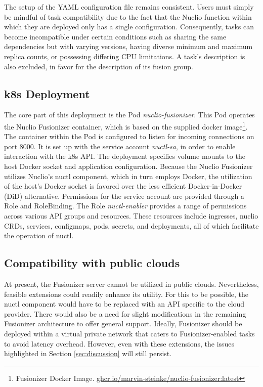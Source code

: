 The setup of the YAML configuration file remains consistent. Users must simply
be mindful of task compatibility due to the fact that the Nuclio function within
which they are deployed only has a single configuration. Consequently, tasks can
become incompatible under certain conditions such as sharing the same
dependencies but with varying versions, having diverse minimum and maximum
replica counts, or possessing differing CPU limitations. A task's description is
also excluded, in favor for the description of its fusion group.

\subsection{k8s Deployment}

The core part of this deployment is the Pod \emph{nuclio-fusionizer}. This Pod
operates the Nuclio Fusionizer container, which is based on the supplied docker
image\footnote{Fusionizer Docker Image.
\url{ghcr.io/marvin-steinke/nuclio-fusionizer:latest}}. The container within the
Pod is configured to listen for incoming connections on port 8000. It is set up
with the service account \emph{nuctl-sa}, in order to enable interaction with
the k8s API. The deployment specifies volume mounts to the host Docker socket
and application configuration. Because the Nuclio Fusionizer utilizes Nuclio's
nuctl component, which in turn employs Docker, the utilization of the host's
Docker socket is favored over the less efficient Docker-in-Docker (DiD)
alternative. Permissions for the service account are provided through a Role and
RoleBinding. The Role \emph{nuctl-enabler} provides a range of permissions
across various API groups and resources. These resources include ingresses,
nuclio CRDs, services, configmaps, pods, secrets, and deployments, all of which
facilitate the operation of nuctl.

\subsection{Compatibility with public clouds}
\label{subsec:fusionize:compatibility_with_public_clouds}


At present, the Fusionizer server cannot be utilized in public clouds.
Nevertheless, feasible extensions could readily enhance its utility. For this to
be possible, the nuctl component would have to be replaced with an API specific
to the cloud provider. There would also be a need for slight modifications in
the remaining Fusionizer architecture to offer general support. Ideally,
Fusionizer should be deployed within a virtual private network that caters to
Fusionizer-enabled tasks to avoid latency overhead. However, even with these
extensions, the issues highlighted in Section \ref{sec:discussion} will still
persist.

